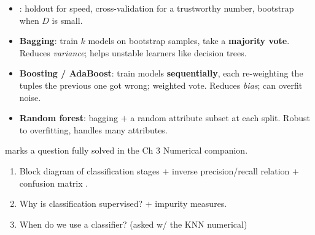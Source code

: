 \begin{itemize}
  \item {}: holdout for speed, cross-validation for a
        trustworthy number, bootstrap when $D$ is small.
\end{itemize}

\vspace{2pt}
\begin{itemize}
  \item \textbf{Bagging}: train $k$ models on bootstrap samples, take a \textbf{majority vote}.
        Reduces \emph{variance}; helps unstable learners like decision trees.
  \item \textbf{Boosting / AdaBoost}: train models \textbf{sequentially}, each re-weighting the
        tuples the previous one got wrong; weighted vote. Reduces \emph{bias}; can overfit noise.
  \item \textbf{Random forest}: bagging $+$ a random attribute subset at each split.
        Robust to overfitting, handles many attributes.
\end{itemize}

\hr


{\color{sub}\footnotesize {} marks a question fully solved in the Ch 3 Numerical companion.}

\begin{enumerate}
  \item {} Block diagram of classification stages $+$ inverse precision/recall relation
        $+$ confusion matrix . \hfill {} 
  \item Why is classification supervised? $+$ impurity measures. \hfill {} 
  \item When do we use a classifier? (asked w/ the KNN numerical) \hfill {} 
\end{enumerate}

